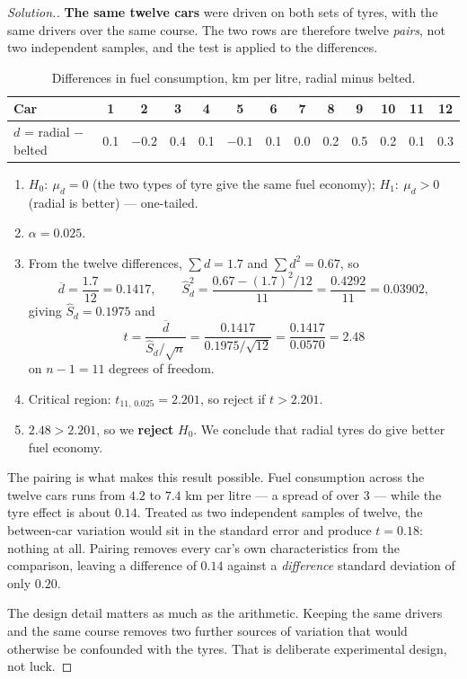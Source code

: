 \documentclass[11pt,a4paper]{article}
\theoremstyle{definition}
\newenvironment{solution}
  {\renewcommand{\qedsymbol}{}\begin{proof}[\textit{Solution}.]}
  {\end{proof}}
\begin{document}
\begin{solution}
\textbf{The same twelve cars} were driven on both sets of tyres, with the same drivers over
the same course. The two rows are therefore twelve \emph{pairs}, not two independent
samples, and the test is applied to the differences.
\begin{table}[H]
\centering
\begin{tabular}{l|cccccccccccc}
Car & 1 & 2 & 3 & 4 & 5 & 6 & 7 & 8 & 9 & 10 & 11 & 12\\
\hline
$d$ = radial $-$ belted & 0.1 & $-0.2$ & 0.4 & 0.1 & $-0.1$ & 0.1 & 0.0 & 0.2 & 0.5 & 0.2 & 0.1 & 0.3\\
\end{tabular}
\caption{Differences in fuel consumption, km per litre, radial minus belted.}
\end{table}
\begin{enumerate}
\item $H_0:\ \mu_d=0$ (the two types of tyre give the same fuel economy);
$H_1:\ \mu_d>0$ (radial is better) --- one-tailed.
\item $\alpha=0.025$.
\item From the twelve differences, $\sum d=1.7$ and $\sum d^2=0.67$, so
\[\overline{d}=\frac{1.7}{12}=0.1417,\qquad
\hat{S}_d^2=\frac{0.67-(1.7)^2/12}{11}=\frac{0.4292}{11}=0.03902,\]
giving $\hat{S}_d=0.1975$ and
\[t=\frac{\overline{d}}{\hat{S}_d/\sqrt{n}}=\frac{0.1417}{0.1975/\sqrt{12}}
=\frac{0.1417}{0.0570}=2.48\]
on $n-1=11$ degrees of freedom.
\item Critical region: $t_{11,\,0.025}=2.201$, so reject if $t>2.201$.
\item $2.48>2.201$, so we \textbf{reject} $H_0$. We conclude that radial tyres do give
better fuel economy.
\end{enumerate}

The pairing is what makes this result possible. Fuel consumption across the twelve cars runs
from $4.2$ to $7.4$ km per litre --- a spread of over $3$ --- while the tyre effect is about
$0.14$. Treated as two independent samples of twelve, the between-car variation would sit in
the standard error and produce $t=0.18$: nothing at all. Pairing removes every car's own
characteristics from the comparison, leaving a difference of $0.14$ against a
\emph{difference} standard deviation of only $0.20$.

The design detail matters as much as the arithmetic. Keeping the same drivers and the same
course removes two further sources of variation that would otherwise be confounded with the
tyres. That is deliberate experimental design, not luck.
\end{solution}
\end{document}
